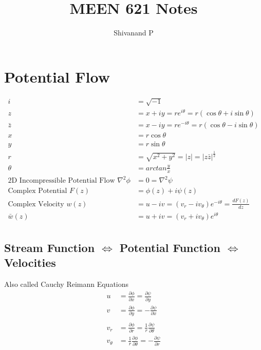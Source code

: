 \documentclass[10pt, letterpaper, notitlepage, landscape]{article}
\title{MEEN 621 Notes}
\author{Shivanand P}
\begin{document}
\sffamily
\sffamily{}

\maketitle
\renewcommand{\cftpartleader}{\cftdotfill{\cftdotsep}} %
\renewcommand{\cftsecleader}{\cftdotfill{\cftdotsep}}
\tableofcontents
\pagestyle{empty}

\newpage
\setcounter{page}{1}

\pagestyle{fancy}
\fancyhead{}    
\fancyfoot{}
\renewcommand{\headrulewidth}{0pt}
\renewcommand{\footrulewidth}{0pt}
\renewcommand{\arraystretch}{1.75}

\section{Potential Flow}
\begin{align*}
i &= \sqrt{-1} \\
z &= x + i y = r e^{i \theta} = r (\cos{\theta} + i \sin{\theta}) \\
\bar{z} &= x - i y = r e^{-i \theta} = r (\cos{\theta} - i \sin{\theta}) \\
x &= r \cos{\theta} \\
y &= r \sin{\theta} \\
r &= \sqrt{x^2 + y^2} = |z| = |z \bar{z}|^{\frac{1}{2}} \\
\theta &= arctan{\frac{y}{x}} \\
\text{2D Incompressible Potential Flow } \nabla^2 \phi &= 0 = \nabla^2 \psi \\
\text{Complex Potential\ } F(z) &= \phi(z) + i \psi(z) \\
\text{Complex Velocity\ } w(z) &= u - i v = (v_r - i v_{\theta}) e^{-i \theta} = \frac{dF(z)}{dz} \\
\bar{w}(z) &= u + i v = (v_r + i v_{\theta}) e^{i \theta} \\
\end{align*}


\subsection{Stream Function $\Leftrightarrow$ Potential Function $\Leftrightarrow$ Velocities}
Also called Cauchy Reimann Equations
\begin{align*}
u &= \frac{\partial \phi}{\partial x} = \frac{\partial \psi}{\partial y} \\
v &= \frac{\partial \phi}{\partial y} = -\frac{\partial \psi}{\partial x} \\ \\
v_r &= \frac{\partial \phi}{\partial r} = \frac{1}{r} \frac{\partial \psi}{\partial \theta} \\
v_{\theta} &= \frac{1}{r} \frac{\partial \phi}{\partial \theta} = -\frac{\partial \psi}{\partial r} \\
\end{align*}
\end{document}
